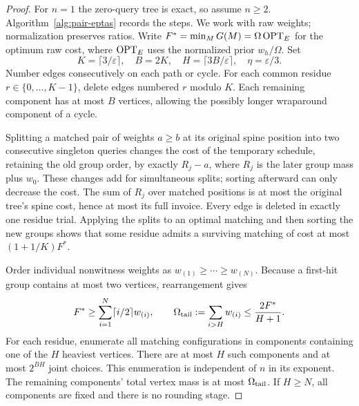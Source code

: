 \begin{proof}
For $n=1$ the zero-query tree is exact, so assume $n\ge2$.
Algorithm~\ref{alg:pair-eptas} records the steps.
We work with raw weights; normalization preserves ratios. Write
$F^*=\min_M G(M)=\Omega\operatorname{OPT}_E$ for the optimum raw cost, where
$\operatorname{OPT}_E$ uses the normalized prior $w_h/\Omega$.
Set
\[
 K=\lceil3/\varepsilon\rceil,\quad B=2K,\quad
 H=\lceil3B/\varepsilon\rceil,\quad \eta=\varepsilon/3.
\]
Number edges consecutively on each path or cycle. For each common
residue $r\in\{0,\ldots,K-1\}$, delete edges numbered $r$ modulo
$K$. Each remaining component has at most $B$ vertices, allowing
the possibly longer wraparound component of a cycle.

Splitting a matched pair of weights $a\ge b$ at its original spine
position into two consecutive singleton queries changes the cost of
the temporary schedule, retaining the old group order, by exactly
$R_j-a$, where $R_j$ is the later group mass plus $w_0$.
These changes add for simultaneous splits; sorting afterward can
only decrease the cost. The sum of $R_j$ over
matched positions is at most the original tree's spine cost, hence
at most its full invoice. Every edge is deleted in exactly one
residue trial. Applying the splits to an optimal matching and then
sorting the new groups shows that some residue admits a surviving
matching of cost at most $(1+1/K)F^*$.

Order individual nonwitness weights as $w_{(1)}\ge\cdots\ge w_{(N)}$.
Because a first-hit group contains at most two vertices,
rearrangement gives
\[
 F^*\ge\sum_{i=1}^N\lceil i/2\rceil w_{(i)},\qquad
 \Omega_{\rm tail}:=\sum_{i>H}w_{(i)}
 \le\frac{2F^*}{H+1}.
\]
For each residue, enumerate all matching configurations in components
containing one of the $H$ heaviest vertices. There are at most $H$
such components and at most $2^{BH}$ joint choices. This enumeration
is independent of $n$ in its exponent. The remaining components'
total vertex mass is at most $\Omega_{\rm tail}$. If $H\ge N$,
all components are fixed and there is no rounding stage.


\end{proof}
